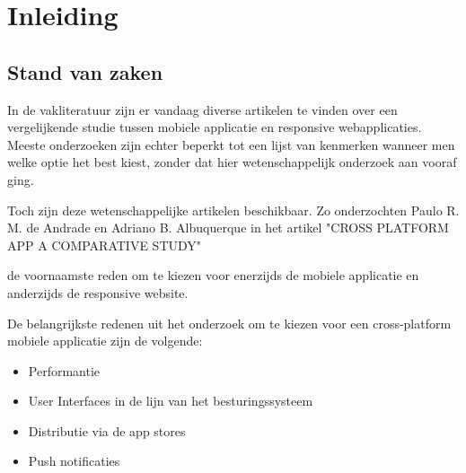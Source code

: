 
\chapter{Inleiding}
\label{ch:inleiding}



\section{Stand van zaken}
\label{sec:stand-van-zaken}

In de vakliteratuur zijn er vandaag diverse artikelen te vinden over een vergelijkende studie tussen mobiele applicatie
en responsive webapplicaties. Meeste onderzoeken zijn echter beperkt tot een lijst van kenmerken wanneer men welke optie
het best kiest, zonder dat hier wetenschappelijk onderzoek aan vooraf ging.

Toch zijn deze wetenschappelijke artikelen beschikbaar. Zo onderzochten \citep{paulor.m.deandradeandrianob.albuquerque2015}Paulo R. M. de Andrade en Adriano B. Albuquerque
in het artikel "CROSS PLATFORM APP A COMPARATIVE STUDY"

de voornaamste reden om te kiezen voor enerzijds de mobiele applicatie en anderzijds de responsive website.

De belangrijkste redenen uit het onderzoek om te kiezen voor een cross-platform mobiele applicatie zijn de volgende:
\begin{itemize}
  \item{Performantie}
  \item{User Interfaces in de lijn van het besturingssysteem}
  \item{Distributie via de app stores}
  \item{Push notificaties}
\end{itemize}

